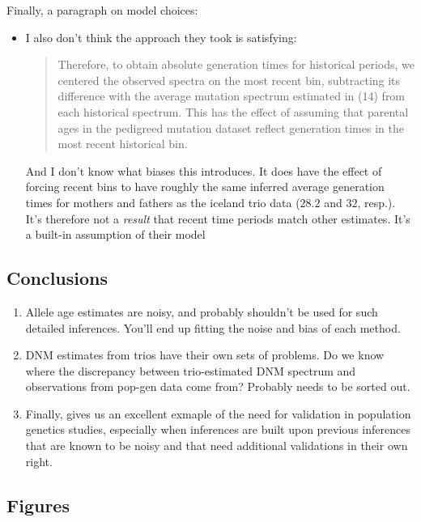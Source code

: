 \documentclass[]{article}
\begin{document}
Finally, a paragraph on model choices:
\begin{itemize}
    \item I also don't think the approach they took is satisfying:
        \begin{quote}
            Therefore, to obtain absolute generation times for historical
            periods, we centered the observed spectra on the most recent bin,
            subtracting its difference with the average mutation spectrum
            estimated in (14) from each historical spectrum.  This has the
            effect of assuming that parental ages in the pedigreed mutation
            dataset reflect generation times in the most recent historical bin.
        \end{quote}
        And I don't know what biases this introduces. It does have the effect
        of forcing recent bins to have roughly the same inferred average
        generation times for mothers and fathers as the iceland trio data
        ($28.2$ and $32$, resp.). It's therefore not a \emph{result} that
        recent time periods match other estimates. It's a built-in assumption
        of their model
\end{itemize}

\subsection*{Conclusions}

\begin{enumerate}
    \item Allele age estimates are noisy, and probably shouldn't be used
        for such detailed inferences. You'll end up fitting the noise and
        bias of each method.
    \item DNM estimates from trios have their own sets of problems. Do we
        know where the discrepancy between trio-estimated DNM spectrum and
        observations from pop-gen data come from? Probably needs to be
        sorted out.
    \item Finally, \citet{wang2023human} gives us an excellent exmaple of the
        need for validation in population genetics studies, especially when
        inferences are built upon previous inferences that are known to be
        noisy and that need additional validations in their own right.
\end{enumerate}

\break

\subsection*{Figures}
\end{document}
